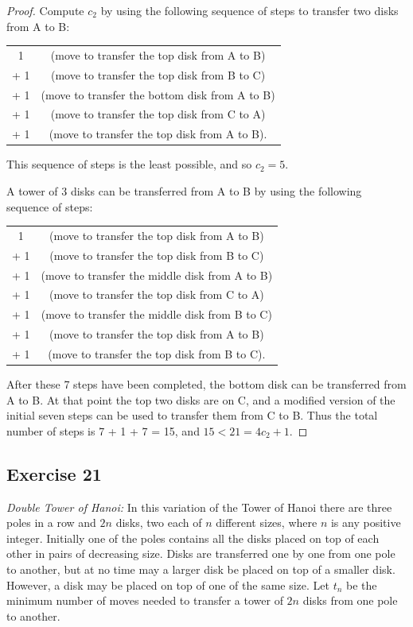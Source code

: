 \documentclass[14pt]{extarticle}
\begin{document}
\begin{proof}
Compute $c_2$ by using the following sequence of steps to transfer two disks from A to B:

\begin{tabular}{cc}
1 & (move to transfer the top disk from A to B) \\
+ 1 & (move to transfer the top disk from B to C) \\
+ 1 & (move to transfer the bottom disk from A to B) \\
+ 1 & (move to transfer the top disk from C to A) \\
+ 1 & (move to transfer the top disk from A to B).
\end{tabular}

This sequence of steps is the least possible, and so $c_2 = 5$.

A tower of 3 disks can be transferred from A to B by using the following sequence of steps:

\begin{tabular}{cc}
1 & (move to transfer the top disk from A to B) \\
+ 1 & (move to transfer the top disk from B to C) \\
+ 1 & (move to transfer the middle disk from A to B) \\
+ 1 & (move to transfer the top disk from C to A) \\
+ 1 & (move to transfer the middle disk from B to C) \\
+ 1 & (move to transfer the top disk from A to B) \\
+ 1 & (move to transfer the top disk from B to C).
\end{tabular}

After these 7 steps have been completed, the bottom disk can be transferred from A to B. At that point the top two 
disks are on C, and a modified version of the initial seven steps can be used to transfer them from C to B. Thus the 
total number of steps is 7 + 1 + 7 = 15, and $15 < 21 = 4c_2 + 1$.
\end{proof}

\subsection{Exercise 21}
{\it Double Tower of Hanoi:} In this variation of the Tower of Hanoi there are three poles in a row and $2n$ disks, two 
each of $n$ different sizes, where $n$ is any positive integer. Initially one of the poles contains all the disks 
placed on top of each other in pairs of decreasing size. Disks are transferred one by one from one pole to another, 
but at no time may a larger disk be placed on top of a smaller disk. However, a disk may be placed on top of one 
of the same size. Let $t_n$ be the minimum number of moves needed to transfer a tower of $2n$ disks from one pole to another.
\end{document}
